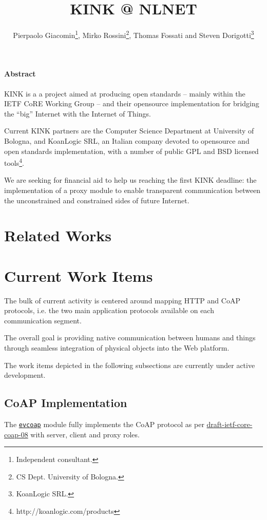 \documentclass[12pt]{article}
\title{KINK @ NLNET}
\author{Pierpaolo Giacomin\footnote{Independent consultant.}, Mirko Rossini\footnote{CS Dept. University of Bologna.}, Thomas Fossati and Steven Dorigotti\footnote{KoanLogic SRL.}}
\newcommand{\swmod}[1]{\mbox{\texttt{#1}}}
\begin{document}
\maketitle
\tableofcontents

\paragraph{Abstract}
KINK is a a project aimed at producing open standards -- mainly within the IETF CoRE Working Group -- and their \mbox{opensource} implementation for bridging the ``big'' Internet with the Internet of Things.

Current KINK partners are the Computer Science Department at University of Bologna, and KoanLogic SRL, an Italian company devoted to \mbox{opensource} and open standards implementation, with a number of public GPL and BSD licensed tools\footnote{http://koanlogic.com/products}.

We are seeking for financial aid to help us reaching the first KINK deadline: the implementation of a proxy module to enable transparent communication between the unconstrained and constrained sides of future Internet.

\section{Related Works}


\section{Current Work Items}
The bulk of current activity is centered around mapping HTTP and CoAP protocols, i.e. the two main application protocols available on each communication segment.

The overall goal is providing native communication between humans and things through seamless integration of physical objects into the Web platform.

The work items depicted in the following subsections are currently under active development.

\subsection{CoAP Implementation}
The \href{https://github.com/koanlogic/webthings/bits/evcoap}{\swmod{evcoap}} module fully implements the CoAP protocol as per \href{http://tools.ietf.org/html/draft-ietf-core-coap}{draft-ietf-core-coap-08} with server, client and proxy roles.
\end{document}
